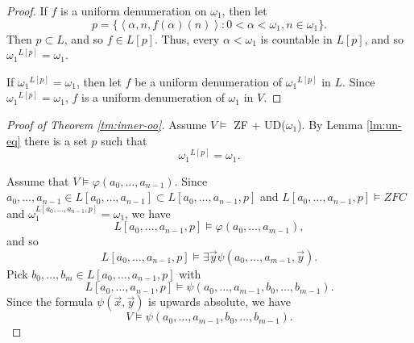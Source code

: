 \documentclass[a4paper,10pt,reqno]{amsart}
\numberwithin{equation}{section}
\theoremstyle{definition}
\theoremstyle{remark}
\newcommand{\subs}{\subset}
\def\<{\left\langle}
\def\>{\right\rangle}
\begin{document}
            \begin{proof}
            If $f$ is a uniform denumeration on ${\omega}_1$, then let
            $$p=\{\<{\alpha},n,f({\alpha})(n)\>:0<{\alpha}<{\omega}_1, n\in {\omega}_1\}.$$
Then $p\subs L$, and so  $f\in L[p]$. Thus, every ${\alpha}<{\omega}_1$ is countable in $L[p]$,
and so   ${{\omega}_1}^{L[p]}={\omega}_1$.
            
            If ${{\omega}_1}^{L[p]}={\omega}_1$, then let $f$ be a uniform  denumeration of
            ${{\omega}_1}^{L[p]}$ in $L$. Since  ${{\omega}_1}^{L[p]}={\omega}_1$, 
            $f$ is a  uniform  denumeration of
            ${\omega}_1$ in $V$.
            \end{proof}
            
            


        \begin{proof}[Proof of  Theorem \ref{tm:inner-oo}]
            Assume $V\vDash$ ZF + UD($\omega_1$). By Lemma \ref{lm:un-eq}
            there is a set $p$ such that  
            \begin{displaymath}
            {{\omega}_1}^{L[p]}={\omega}_1.
            \end{displaymath}

            Assume that $V\vDash{\varphi}(a_0,\dots, a_{n-1})$. 
            Since  $a_0,\dots, a_{n-1}\in L[a_0,\dots, a_{n-1}]\subs  L[a_0,\dots, a_{n-1},p]$
            and $L[a_0,\dots, a_{n-1},p]\vDash ZFC$ and ${\omega}_1^{L[a_0,\dots, a_{n-1},p]}={\omega}_1$, 
            we have 
            \begin{displaymath}
                L[a_0,\dots, a_{n-1},p] \vDash {\varphi}(a_0,\dots, a_{m-1}),
            \end{displaymath}
and so 
            \begin{displaymath}
                L[a_0,\dots, a_{n-1},p] \vDash \exists \vec y \psi(a_0,\dots, a_{m-1},\vec y).
            \end{displaymath}
             Pick $b_0,\dots, b_m\in L[a_0,\dots, a_{n-1},p]$ with 
            \begin{displaymath}
                L[a_0,\dots, a_{n-1},p] \vDash \psi(a_0,\dots, a_{m-1}, b_0,\dots, b_{m-1}).
            \end{displaymath}
            Since the formula $\psi(\vec x,\vec y)$ is  upwards absolute, we have  
            $$V\vDash\psi(a_0,\dots, a_{m-1}, b_0,\dots, b_{m-1}).$$
            \end{proof}
            
\end{document}
